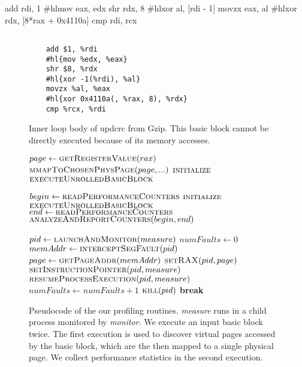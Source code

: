     add rdi, 1
    #hl{mov eax, edx}
    shr rdx, 8
    #hl{xor al, [rdi - 1]}
    movzx eax, al
    #hl{xor rdx, [8*rax + 0x4110a]}
    cmp rdi, rcx
\fi
\begin{figure}[h]
\begin{Verbatim}[commandchars=\#\{\}]
    
    add $1, %rdi
    #hl{mov %edx, %eax}
    shr $8, %rdx
    #hl{xor -1(%rdi), %al}
    movzx %al, %eax
    #hl{xor 0x4110a(, %rax, 8), %rdx}
    cmp %rcx, %rdi
\end{Verbatim}
\caption{Inner loop body of updcrc from Gzip.
This basic block cannot be directly executed because
of its memory accesses.}
\label{fig:mem-ex}
\end{figure}

\begin{figure}
\begin{algorithmic}

    \State $page \gets \Call{getRegisterValue}{rax}$
    \State $\Call{mmapToChosenPhysPage}{page, ...}$
    \State $\Call{initialize}{}$
    \State $\Call{executeUnrolledBasicBlock}{}$
    
    
    \State $begin \gets \Call{readPerformanceCounters}{}$
    \State $\Call{initialize}{}$
    \State $\Call{executeUnrolledBasicBlock}{}$
    \State $end \gets \Call{readPerformanceCounters}{}$
    \State $\Call{analyzeAndReportCounters}{begin, end}$
\EndFunction

    \State $pid \gets \Call{launchAndMonitor}{measure}$
    \State $numFaults \gets 0$
        \State $memAddr \gets \Call{interceptSegFault}{pid}$
            \State $page \gets \Call{getPageAddr}{memAddr}$
            \State $\Call{setRAX}{pid, page}$
            \State $\Call{setInstructionPointer}{pid, measure}$
            \State $\Call{resumeProcessExecution}{pid, measure}$
            \State $numFaults \gets numFaults + 1$
        \EndIf
            \State $\Call{kill}{pid}$
            \State \textbf{break}
        \EndIf
    \EndWhile
\EndFunction

\end{algorithmic}

\caption{Pseudocode of the our profiling routines. 
\textit{measure} runs in a child process monitored by
\textit{monitor}.
We execute an input basic block twice.
The first execution is used to discover virtual pages accessed
by the basic block, which are the then mapped to a single physical page.
We collect performance statistics in the second execution.}
\label{fig:code}
\end{figure}

